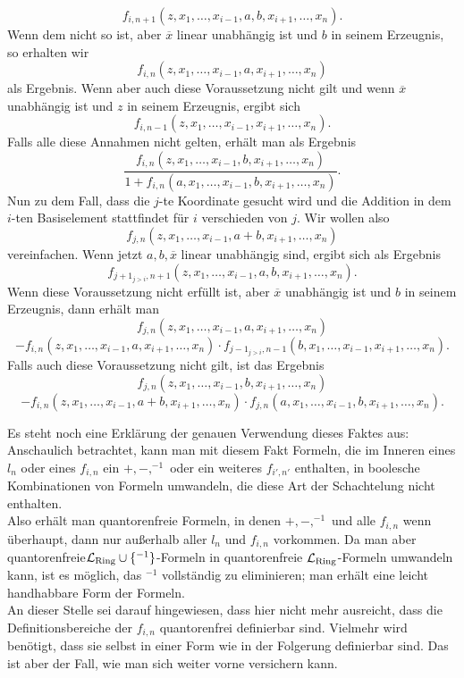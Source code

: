 \begin{fact}
    	$$f_{i,n+1}(z,x_1,\dots,x_{i-1},a,b,x_{i+1},\dots,x_n).$$
    	Wenn dem nicht so ist, aber $\overline{x}$ linear unabhängig ist und $b$ in seinem Erzeugnis, so erhalten wir $$f_{i,n}(z,x_1,\dots,x_{i-1},a,x_{i+1},\dots,x_n)$$ als Ergebnis. Wenn aber auch diese Voraussetzung nicht gilt und wenn $\overline{x}$ unabhängig ist und $z$ in seinem Erzeugnis, ergibt sich
    	$$f_{i,n-1}(z,x_1,\dots,x_{i-1},x_{i+1},\dots,x_n).$$
    	Falls alle diese Annahmen nicht gelten, erhält man als Ergebnis
    	$$\frac{f_{i,n}(z,x_1,\dots,x_{i-1},b,x_{i+1},\dots,x_n)}{1+f_{i,n}(a,x_1,\dots,x_{i-1},b,x_{i+1},\dots,x_n)}.$$\newpage
    	Nun zu dem Fall, dass die $j$-te Koordinate gesucht wird und die Addition in dem $i$-ten Basiselement stattfindet für $i$ verschieden von $j$. Wir wollen also $$f_{j,n}(z,x_1,\dots,x_{i-1},a+b,x_{i+1},\dots,x_n)$$ vereinfachen. Wenn jetzt $a,b,\overline{x}$ linear unabhängig sind, ergibt sich als Ergebnis
    	$$f_{j+1_{j>i},n+1}(z,x_1,\dots,x_{i-1},a,b,x_{i+1},\dots,x_n).$$
    	Wenn diese Voraussetzung nicht erfüllt ist, aber $\overline{x}$ unabhängig ist und $b$ in seinem Erzeugnis, dann erhält man
    	$$f_{j,n}(z,x_1,\dots,x_{i-1},a,x_{i+1},\dots,x_n)$$ $$-f_{i,n}(z,x_1,\dots,x_{i-1},a,x_{i+1},\dots,x_n)\cdot f_{j-1_{j>i},n-1}(b,x_1,\dots,x_{i-1},x_{i+1},\dots,x_n).$$
    	Falls auch diese Voraussetzung nicht gilt, ist das Ergebnis
    	$$f_{j,n}(z,x_1,\dots,x_{i-1},b,x_{i+1},\dots,x_n)$$ $$-f_{i,n}(z,x_1,\dots,x_{i-1},a+b,x_{i+1},\dots,x_n)\cdot f_{j,n}(a,x_1,\dots,x_{i-1},b,x_{i+1},\dots,x_n).$$
    \end{fact}
    
    Es steht noch eine Erklärung der genauen Verwendung dieses Faktes aus:\\
    Anschaulich betrachtet, kann man mit diesem Fakt Formeln, die im Inneren eines $l_n$ oder eines $f_{i,n}$ ein $+,-,^{-1}$ oder ein weiteres $f_{i',n'}$ enthalten, in boolesche Kombinationen von Formeln umwandeln, die diese Art der Schachtelung nicht enthalten.\\
    Also erhält man quantorenfreie Formeln, in denen $+,-,^{-1}$ und alle $f_{i,n}$ wenn überhaupt, dann nur außerhalb aller $l_n$ und $f_{i,n}$ vorkommen. Da man aber quantorenfreie\linebreak$\mathcal{L}_\text{Ring}\cup\{^{-1}\}$-Formeln in quantorenfreie $\mathcal{L}_\text{Ring}$-Formeln umwandeln kann, ist es möglich, das \glqq{}$^{-1}$\grqq{} vollständig zu eliminieren; man erhält eine leicht handhabbare Form der Formeln.\\
    An dieser Stelle sei darauf hingewiesen, dass hier nicht mehr ausreicht, dass die Definitionsbereiche der $f_{i,n}$ quantorenfrei definierbar sind. Vielmehr wird benötigt, dass sie selbst in einer Form wie in der Folgerung definierbar sind. Das ist aber der Fall, wie man sich weiter vorne versichern kann.
    \newpage
    
